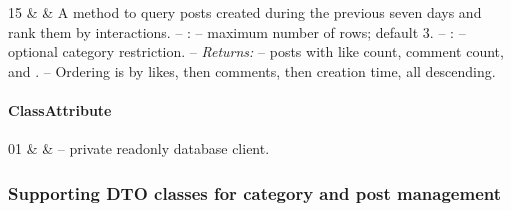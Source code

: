 \begin{ClassMethodTable}
15 & \newline{}\newline{} &
A method to query posts created during the previous seven days and rank them by interactions.
\newline -- :  -- maximum number of rows; default 3.
\newline -- :  -- optional category restriction.
\newline -- \textit{Returns:}  -- posts with like count, comment count, and .
\newline -- Ordering is by likes, then comments, then creation time, all descending. \\ \hline
\end{ClassMethodTable}

\paragraph{ClassAttribute}
\begin{ClassAttributeTable}
01 &  &  -- private readonly database client. \\ \hline
\end{ClassAttributeTable}

\subsubsection*{Supporting DTO classes for category and post management}

